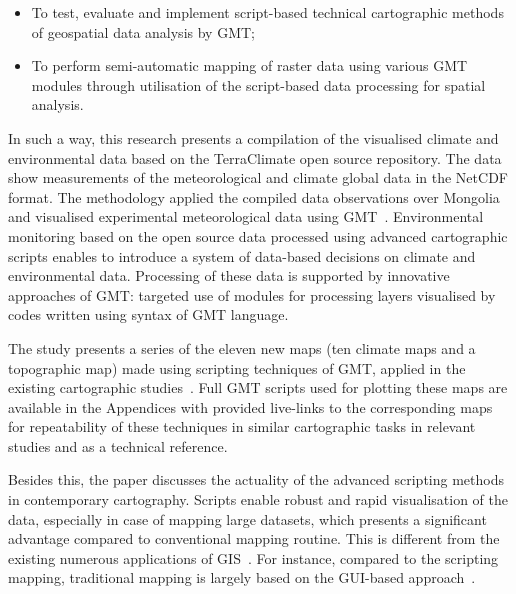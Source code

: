 \documentclass[geosciences,article,accept,pdftex,oneauthor]{Definitions/mdpi}
\begin{document}
\begin{itemize}
	\item To test, evaluate and implement script-based technical cartographic methods of geospatial data analysis by GMT;
	\item	To perform semi-automatic mapping of raster data using various GMT modules through utilisation of the script-based data processing for spatial analysis.
\end{itemize}

In such a way, this research presents a compilation of the visualised climate and environmental data based on the TerraClimate open source repository. The data show measurements of the meteorological and climate global data in the NetCDF format. The methodology applied the compiled data observations over Mongolia and visualised experimental meteorological data using GMT~\cite{Wesseletal2019}. {Environmental monitoring based on the open source data processed using advanced cartographic scripts enables to introduce a system of data-based decisions on climate and environmental data. Processing of these data is supported by innovative approaches of GMT: targeted use of modules for processing layers visualised by codes written using syntax of GMT language.}

The study presents a series of the eleven new maps (ten climate maps and a topographic map) made using scripting techniques of GMT, applied in the existing cartographic studies~\cite{Lemenkova2019a,Kasalica,Lemenkova2021d,Spinellis,Lemenkova2021e,Virden}. Full GMT scripts used for plotting these maps are available in the Appendices with provided live-links to the corresponding maps for repeatability of these techniques in similar cartographic tasks in relevant studies and as a technical reference.

Besides this, the paper discusses the actuality of the advanced scripting methods in contemporary cartography. Scripts enable robust and rapid visualisation of the data, especially in case of mapping large datasets, which presents a significant advantage compared to conventional mapping routine. This is different from the existing numerous applications of GIS~\cite{FAN201696,TSUTSUMIDA2015196,Lemenkova2020c,Amarsaikhan,NAKAYAMA2021109404,Lemenkova2020d,PARK2019103630,OSULLIVAN2019101979}. For instance, compared to the scripting mapping, traditional mapping is largely based on the GUI-based approach~\cite{Tuvshin,Lemenkova2020e,Lemenkova2021f,HOLGUIN2018137}. 
\end{document}
